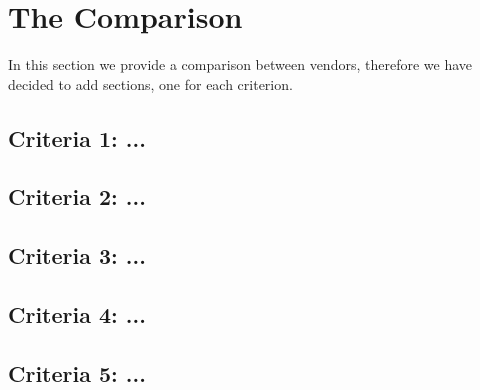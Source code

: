 \section{The Comparison}
In this section we provide a comparison between vendors, therefore we have decided to add sections, one for each criterion. 

\subsection{Criteria 1: ...}
    
\subsection{Criteria 2: ...}
    
\subsection{Criteria 3: ...}

\subsection{Criteria 4: ...}

\subsection{Criteria 5: ...}

